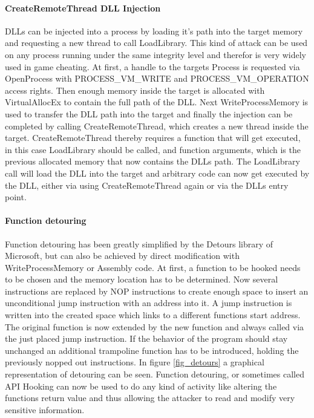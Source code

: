\paragraph{CreateRemoteThread DLL Injection}
DLLs can be injected into a process by loading it's path into the target memory and requesting a new thread to call LoadLibrary. This kind of attack can be used on any process running under the same integrity level and therefor is very widely used in game cheating. At first, a handle to the targets Process is requested via OpenProcess with PROCESS\_VM\_WRITE and PROCESS\_VM\_OPERATION access rights. Then enough memory inside the target is allocated with VirtualAllocEx to contain the full path of the DLL. Next WriteProcessMemory is used to transfer the DLL path into the target and finally the injection can be completed by calling CreateRemoteThread, which creates a new thread inside the target. CreateRemoteThread thereby requires a function that will get executed, in this case LoadLibrary should be called, and function arguments, which is the previous allocated memory that now contains the DLLs path. The LoadLibrary call will load the DLL into the target and arbitrary code can now get executed by the DLL, either via using CreateRemoteThread again or via the DLLs entry point.
\paragraph{Function detouring}
Function detouring has been greatly simplified by the Detours\cite{msdetours} library of Microsoft, but can also be achieved by direct modification with WriteProcessMemory or Assembly code. At first, a function to be hooked needs to be chosen and the memory location has to be determined. Now several instructions are replaced by NOP instructions to create enough space to insert an unconditional jump instruction with an address into it. A jump instruction is written into the created space which links to a different functions start address. The original function is now extended by the new function and always called via the just placed jump instruction. If the behavior of the program should stay unchanged an additional trampoline function has to be introduced, holding the previously nopped out instructions. In figure \ref{fig_detours} a graphical representation of detouring can be seen. Function detouring, or sometimes called API Hooking can now be used to do any kind of activity like altering the functions return value and thus allowing the attacker to read and modify very sensitive information.

